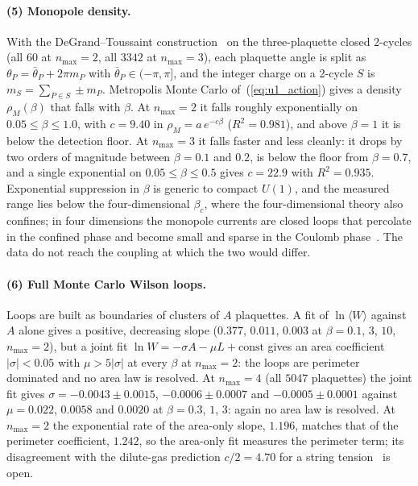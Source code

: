 \documentclass[11pt]{article}
\begin{document}
\paragraph{(5) Monopole density.}
With the DeGrand--Toussaint construction~\cite{degrand_toussaint1980} on the
three-plaquette closed 2-cycles (all $60$ at $n_{\max}=2$, all $3342$ at
$n_{\max}=3$),
each plaquette angle is split as $\theta_P=\bar\theta_P+2\pi m_P$ with
$\bar\theta_P\in(-\pi,\pi]$, and the integer charge on a 2-cycle $S$ is
$m_S=\sum_{P\in S}\pm m_P$.  Metropolis Monte Carlo of~(\ref{eq:u1_action})
gives a density $\rho_M(\beta)$ that falls with $\beta$.  At $n_{\max}=2$ it
falls roughly exponentially on $0.05\le\beta\le1.0$, with $c=9.40$ in
$\rho_M=a\,e^{-c\beta}$ ($R^2=0.981$), and above $\beta=1$ it is below the
detection floor.  At $n_{\max}=3$ it falls faster and less cleanly: it drops
by two orders of magnitude between $\beta=0.1$ and $0.2$, is below the floor
from $\beta=0.7$, and a single exponential on $0.05\le\beta\le0.5$ gives
$c=22.9$ with $R^2=0.935$.  Exponential suppression in $\beta$ is generic to
compact $U(1)$, and the measured range lies below the four-dimensional
$\beta_c$, where the four-dimensional theory also confines; in four
dimensions the monopole currents are closed loops that percolate in the
confined phase and become small and sparse in the Coulomb
phase~\cite{drouffe_zuber1983,degrand_toussaint1980}.  The data do not reach
the coupling at which the two would differ.

\paragraph{(6) Full Monte Carlo Wilson loops.}
Loops are built as boundaries of clusters of $A$ plaquettes.  A fit of
$\ln\langle W\rangle$ against $A$ alone gives a positive, decreasing slope
($0.377$, $0.011$, $0.003$ at $\beta=0.1$, $3$, $10$, $n_{\max}=2$), but a
joint fit $\ln W=-\sigma A-\mu L+\mathrm{const}$ gives an area coefficient
$|\sigma|<0.05$ with $\mu>5|\sigma|$ at every $\beta$ at $n_{\max}=2$: the loops are
perimeter dominated and no area law is resolved.  At $n_{\max}=4$ (all
$5047$ plaquettes) the joint fit gives $\sigma=-0.0043\pm0.0015$,
$-0.0006\pm0.0007$ and $-0.0005\pm0.0001$ against $\mu=0.022$, $0.0058$ and
$0.0020$ at $\beta=0.3$, $1$, $3$: again no area law is resolved.  At
$n_{\max}=2$ the exponential rate of the area-only slope, $1.196$, matches that of
the perimeter coefficient, $1.242$, so the area-only fit measures the
perimeter term; its disagreement with the dilute-gas prediction
$c/2=4.70$ for a string tension~\cite{polyakov1977} is open.
\end{document}
